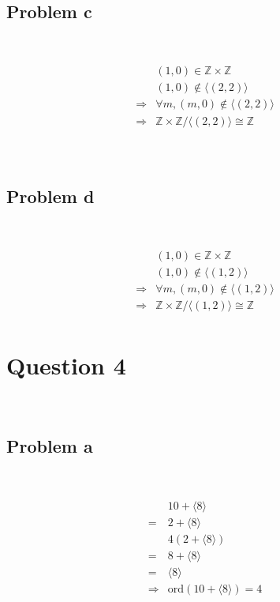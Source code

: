 \documentclass{article}
\begin{document}
~

\subsection*{Problem c}

~

\begin{equation*}
    \begin{split}
        &(1,0)\in\mathbb{Z} \times\mathbb{Z} \\
        &(1,0)\notin \langle(2,2)\rangle\\
        \Rightarrow&\forall m, (m,0)\notin \langle(2,2)\rangle\\
        \Rightarrow&\mathbb{Z} \times\mathbb{Z} /\langle(2,2)\rangle\cong \mathbb{Z} \\
    \end{split}
\end{equation*}

~

\subsection*{Problem d}

~

\begin{equation*}
    \begin{split}
        &(1,0)\in \mathbb{Z} \times\mathbb{Z} \\
        &(1,0)\notin \langle(1,2)\rangle\\
        \Rightarrow&\forall m, (m,0)\notin \langle(1,2)\rangle\\
        \Rightarrow&\mathbb{Z} \times\mathbb{Z} /\langle(1,2)\rangle\cong \mathbb{Z} \\
    \end{split}
\end{equation*}

\newpage

\section*{Question 4}

~

\subsection*{Problem a}

~

\begin{equation*}
    \begin{split}
        &10+\langle8\rangle\\
        =&2+\langle8\rangle\\
        &4(2+\langle8\rangle)\\
        =&8+\langle8\rangle\\
        =&\langle8\rangle\\
        \Rightarrow&\text{ord}(10+\langle8\rangle)=4\\
    \end{split}
\end{equation*}
\end{document}
